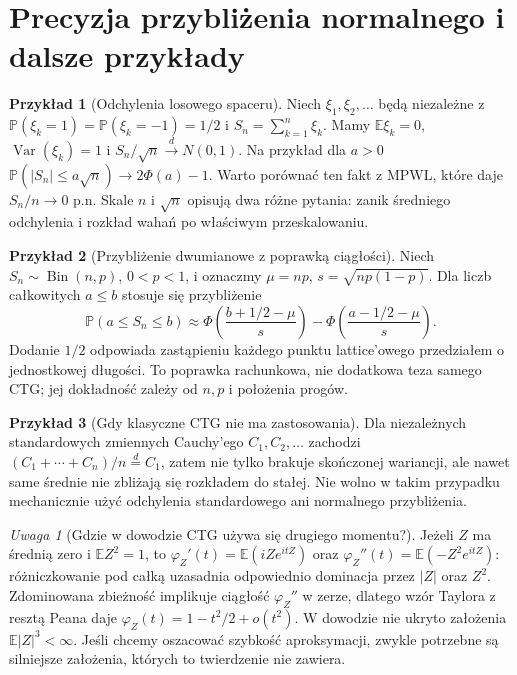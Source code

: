 \documentclass[11pt,a4paper,oneside]{report}
\numberwithin{equation}{chapter}
\theoremstyle{plain}
\theoremstyle{definition}
\newtheorem{przyklad}{Przykład}[chapter]
\theoremstyle{remark}
\newtheorem{uwaga}{Uwaga}[chapter]
\newcommand{\Prob}{\mathbb{P}}
\newcommand{\E}{\mathbb{E}}
\newcommand{\Var}{\operatorname{Var}}
\newcommand{\Bin}{\operatorname{Bin}}
\begin{document}
\section{Precyzja przybliżenia normalnego i dalsze przykłady}

\begin{przyklad}[Odchylenia losowego spaceru]
Niech $\xi_1,\xi_2,\ldots$ będą niezależne z
$\Prob(\xi_k=1)=\Prob(\xi_k=-1)=1/2$ i
$S_n=\sum_{k=1}^n\xi_k$. Mamy $\E\xi_k=0$,
$\Var(\xi_k)=1$ i $S_n/\sqrt n\xrightarrow d N(0,1)$.
Na przykład dla $a>0$
$\Prob(|S_n|\leq a\sqrt n)\to2\Phi(a)-1$.
Warto porównać ten fakt z MPWL, które daje
$S_n/n\to0$ p.n. Skale $n$ i $\sqrt n$ opisują
dwa różne pytania: zanik średniego odchylenia
i rozkład wahań po właściwym przeskalowaniu.
\end{przyklad}

\begin{przyklad}[Przybliżenie dwumianowe z poprawką ciągłości]
Niech $S_n\sim\Bin(n,p)$, $0<p<1$, i oznaczmy
$\mu=np$, $s=\sqrt{np(1-p)}$.
Dla liczb całkowitych $a\leq b$ stosuje się przybliżenie
\[
\Prob(a\leq S_n\leq b)\approx
\Phi\!\left(\frac{b+1/2-\mu}{s}\right)-
\Phi\!\left(\frac{a-1/2-\mu}{s}\right).
\]
Dodanie $1/2$ odpowiada zastąpieniu każdego punktu
lattice'owego przedziałem o jednostkowej długości.
To poprawka rachunkowa, nie dodatkowa teza samego CTG;
jej dokładność zależy od $n,p$ i położenia progów.
\end{przyklad}

\begin{przyklad}[Gdy klasyczne CTG nie ma zastosowania]
Dla niezależnych standardowych zmiennych Cauchy'ego
$C_1,C_2,\ldots$ zachodzi
$(C_1+\cdots+C_n)/n\stackrel d=C_1$, zatem nie tylko
brakuje skończonej wariancji, ale nawet same średnie
nie zbliżają się rozkładem do stałej.
Nie wolno w takim przypadku mechanicznie użyć
odchylenia standardowego ani normalnego przybliżenia.
\end{przyklad}

\begin{uwaga}[Gdzie w dowodzie CTG używa się drugiego momentu?]
Jeżeli $Z$ ma średnią zero i $\E Z^2=1$, to
$\varphi_Z'(t)=\E(iZe^{itZ})$
oraz $\varphi_Z''(t)=\E(-Z^2e^{itZ})$:
różniczkowanie pod całką uzasadnia odpowiednio
dominacja przez $|Z|$ oraz $Z^2$.
Zdominowana zbieżność implikuje ciągłość
$\varphi_Z''$ w zerze, dlatego wzór Taylora
z resztą Peana daje $\varphi_Z(t)=1-t^2/2+o(t^2)$.
W dowodzie nie ukryto założenia $\E|Z|^3<\infty$.
Jeśli chcemy oszacować szybkość aproksymacji,
zwykle potrzebne są silniejsze założenia, których
to twierdzenie nie zawiera.
\end{uwaga}
\end{document}

